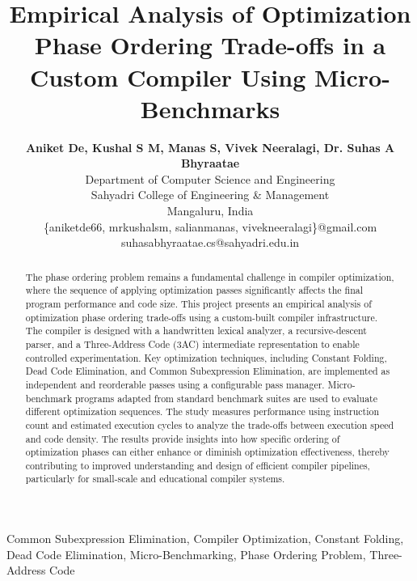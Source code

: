 \documentclass[conference]{IEEEtran}
\begin{document}
\title{Empirical Analysis of Optimization Phase Ordering
Trade-offs in a Custom Compiler Using
Micro-Benchmarks}

\author{
\textbf{Aniket De, Kushal S M, Manas S, Vivek Neeralagi, Dr. Suhas A Bhyraatae}\\
Department of Computer Science and Engineering\\
Sahyadri College of Engineering \& Management\\
Mangaluru, India\\
\{aniketde66, mrkushalsm, salianmanas, vivekneeralagi\}@gmail.com\\
suhasabhyraatae.cs@sahyadri.edu.in
}

\maketitle

\begin{abstract}
The phase ordering problem remains a fundamental challenge in compiler optimization, where the sequence of applying optimization passes significantly affects the final program performance and code size. This project presents an empirical analysis of optimization phase ordering trade-offs using a custom-built compiler infrastructure. The compiler is designed with a handwritten lexical analyzer, a recursive-descent parser, and a Three-Address Code (3AC) intermediate representation to enable controlled experimentation. Key optimization techniques, including Constant Folding, Dead Code Elimination, and Common Subexpression Elimination, are implemented as independent and reorderable passes using a configurable pass manager. Micro-benchmark programs adapted from standard benchmark suites are used to evaluate different optimization sequences. The study measures performance using instruction count and estimated execution cycles to analyze the trade-offs between execution speed and code density. The results provide insights into how specific ordering of optimization phases can either enhance or diminish optimization effectiveness, thereby contributing to improved understanding and design of efficient compiler pipelines, particularly for small-scale and educational compiler systems.
\end{abstract}

\begin{IEEEkeywords}
Common Subexpression Elimination,
Compiler Optimization,
Constant Folding,
Dead Code Elimination,
Micro-Benchmarking,
Phase Ordering Problem,
Three-Address Code
\end{IEEEkeywords}
\end{document}
